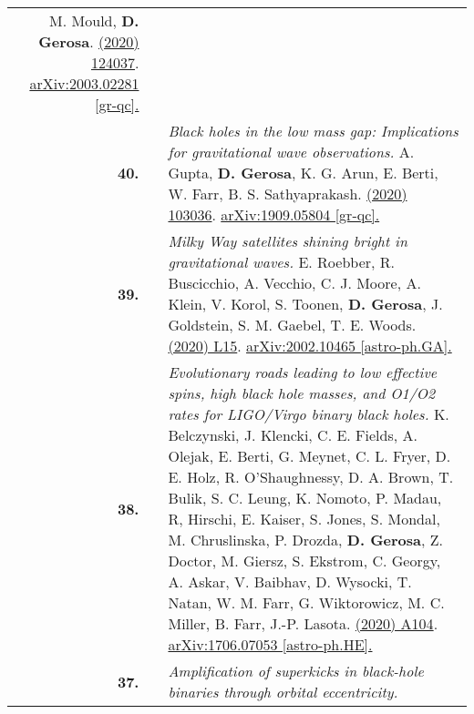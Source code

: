 {\begin{longtable}{rp{0.3cm}p{15.8cm}}
M. Mould, \textbf{D. Gerosa}.
\newline{}
\href{https://journals.aps.org/prd/abstract/10.1103/PhysRevD.101.124037}{\prd 101 (2020) 124037}. \href{https://arxiv.org/abs/2003.02281}{arXiv:2003.02281 [gr-qc].}
\vspace{0.09cm}\\
%
\textbf{40.} & & \textit{Black holes in the low mass gap: Implications for gravitational wave observations.}
\newline{}
A. Gupta, \textbf{D. Gerosa}, K. G. Arun, E. Berti, W. Farr, B. S. Sathyaprakash.
\newline{}
\href{https://journals.aps.org/prd/abstract/10.1103/PhysRevD.101.103036}{\prd 101 (2020) 103036}. \href{https://arxiv.org/abs/1909.05804}{arXiv:1909.05804 [gr-qc].}
\vspace{0.09cm}\\
%
\textbf{39.} & & \textit{Milky Way satellites shining bright in gravitational waves.}
\newline{}
E. Roebber, R. Buscicchio, A. Vecchio, C. J. Moore, A. Klein, V. Korol, S. Toonen, \textbf{D. Gerosa}, J. Goldstein, S. M. Gaebel, T. E. Woods.
\newline{}
\href{https://iopscience.iop.org/article/10.3847/2041-8213/ab8ac9}{\apjl 894 (2020) L15}. \href{https://arxiv.org/abs/2002.10465}{arXiv:2002.10465 [astro-ph.GA].}
\vspace{0.09cm}\\
%
\textbf{38.} & & \textit{Evolutionary roads leading to low effective spins, high black hole masses, and O1/O2 rates for LIGO/Virgo binary black holes.}
\newline{}
K. Belczynski, J. Klencki, C. E. Fields, A. Olejak, E. Berti, G. Meynet, C. L. Fryer, D. E. Holz, R. O'Shaughnessy, D. A. Brown, T. Bulik, S. C. Leung,  K. Nomoto, P. Madau, R, Hirschi, E. Kaiser, S. Jones, S. Mondal, M. Chruslinska, P. Drozda, \textbf{D. Gerosa}, Z. Doctor, M. Giersz, S. Ekstr\:om, C. Georgy, A. Askar, V. Baibhav, D. Wysocki, T. Natan, W. M. Farr, G. Wiktorowicz, M. C. Miller, B. Farr, J.-P. Lasota.
\newline{}
\href{https://www.aanda.org/articles/aa/full_html/2020/04/aa36528-19/aa36528-19.html}{\aap 636 (2020) A104}. \href{https://arxiv.org/abs/1706.07053}{arXiv:1706.07053 [astro-ph.HE].}
\vspace{0.09cm}\\
%
\textbf{37.} & & \textit{Amplification of superkicks in black-hole binaries through orbital eccentricity.}
\newline{}

\end{longtable}}
